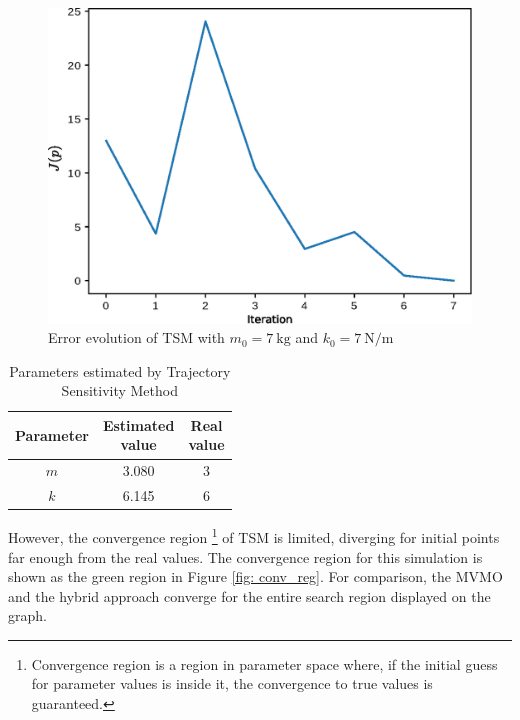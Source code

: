\begin{figure}[h]
	\caption{Error evolution of TSM with $m_{0} = 7\ \text{kg}$ and $k_{0} = 7\ \text{N/m}$}
	\begin{center}
		\includegraphics[scale=0.6]{Images/TS_conv.eps}
	\end{center}
	\label{fig: TS_conv}
\end{figure}

\begin{table}[h]
	\caption{Parameters estimated by Trajectory Sensitivity Method}
	\begin{center}
		\begin{tabular}{c|c|c}
			Parameter & \shortstack{Estimated \\ value} & \shortstack{Real \\ value} \\
			\hline
			$m$ & 3.080 & 3 \\
			$k$ & 6.145 & 6 \\
		\end{tabular}
	\end{center}
	\label{tab: spring_mass_ts}
\end{table}

However, the convergence region \footnote{Convergence region is a region in parameter space where, if the initial guess for parameter values is inside it, the convergence to true values is guaranteed.} of TSM is limited, diverging for initial points far enough from the real values. The convergence region for this simulation is shown as the green region in Figure \ref{fig: conv_reg}. For comparison, the MVMO and the hybrid approach converge for the entire search region displayed on the graph.

